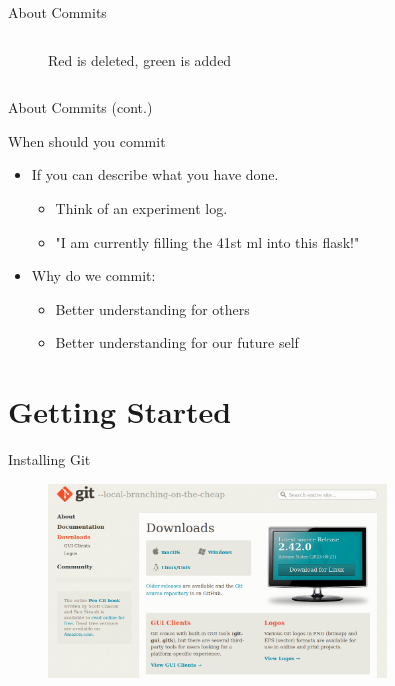 \documentclass[compress,aspectratio=169]{beamer}
\begin{document}
\begin{frame}{About Commits}
\begin{columns}
\begin{column}{0.4\textwidth}
\begin{figure}
          \caption{Red is deleted, green is added}
        \end{figure}
      \end{column}
    \end{columns}
  \end{frame}

  \begin{frame}{About Commits (cont.)}
    \begin{block}{When should you commit}
      \begin{itemize}
        \item If you can describe what you have done.
          \begin{itemize}
            \item Think of an experiment log.
            \item "I am currently filling the 41st ml into this flask!"
          \end{itemize}
        \item Why do we commit:
          \begin{itemize}
            \item Better understanding for others
            \item Better understanding for our future self
          \end{itemize}
      \end{itemize}
    \end{block}
  \end{frame}

	\section{Getting Started}

	\begin{frame}{Installing Git}
    \begin{figure}
      \includegraphics[width=0.8\textwidth]{./assets/gitwebsite.png}
    \end{figure}
	\end{frame}
\end{document}
